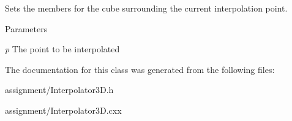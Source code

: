 Sets the members for the cube surrounding the current interpolation point. 


\begin{DoxyParams}{Parameters}
\item[{\em p}]The point to be interpolated \end{DoxyParams}


The documentation for this class was generated from the following files:\begin{DoxyCompactItemize}
\item 
assignment/Interpolator3D.h\item 
assignment/Interpolator3D.cxx\end{DoxyCompactItemize}

